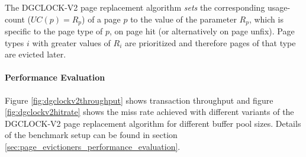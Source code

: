     The DGCLOCK-V2 page replacement algorithm \emph{sets} the corresponding usage-count ($UC\left(p\right) = R_p$) of a page $p$ to the value of the parameter $R_p$, which is specific to the page type of $p$, on page hit (or alternatively on page unfix). Page types $i$ with greater values of $R_i$ are prioritized and therefore pages of that type are evicted later.

\paragraph{Performance Evaluation}

    Figure \ref{fig:dgclockv2throughput} shows transaction throughput and figure \ref{fig:dgclockv2hitrate} shows the miss rate achieved with different variants of the DGCLOCK-V2 page replacement algorithm for different buffer pool sizes. Details of the benchmark setup can be found in section \ref{sec:page_evictioners_performance_evaluation}.

